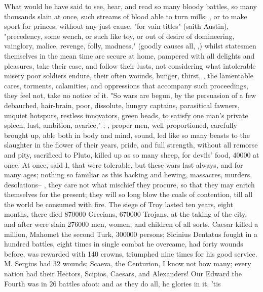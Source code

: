 What would he have said to see, hear, and read so many bloody battles, so many
thousands slain at once, such streams of blood able to turn mills: , or to make sport for princes, without any just cause,
"for vain titles" (saith Austin), "precedency, some wench,
or such like toy, or out of desire of domineering, vainglory, malice, revenge,
folly, madness," (goodly causes all, ,) whilst statesmen themselves in the mean time are secure
at home, pampered with all delights and pleasures, take their ease, and follow
their lusts, not considering what intolerable misery poor soldiers endure,
their often wounds, hunger, thirst, \etc{}, the lamentable cares, torments,
calamities, and oppressions that accompany such proceedings, they feel not,
take no notice of it. "So wars are begun, by the persuasion of a few debauched,
hair-brain, poor, dissolute, hungry captains, parasitical fawners, unquiet
hotspurs, restless innovators, green heads, to satisfy one man's private
spleen, lust, ambition, avarice," \etc{}; , proper men, well proportioned, carefully brought
up, able both in body and mind, sound, led like so many
beasts to the slaughter in the flower of their years,
pride, and full strength, without all remorse and pity, sacrificed to Pluto,
killed up as so many sheep, for devils' food, 40\thinspace{}000 at once. At
once, said I, that were tolerable, but these wars last always, and for many
ages; nothing so familiar as this hacking and hewing, massacres, murders,
desolations-- , they care not what mischief
they procure, so that they may enrich themselves for the present; they will so
long blow the coals of contention, till all the world be consumed with fire.
The siege of Troy lasted ten years, eight months, there
died 870\thinspace{}000 Grecians, 670\thinspace{}000 Trojans, at the taking of
the city, and after were slain 276\thinspace{}000 men, women, and children of
all sorts. Caesar killed a million, Mahomet the second
Turk, 300\thinspace{}000 persons; Sicinius Dentatus fought in a hundred
battles, eight times in single combat he overcame, had forty wounds before, was
rewarded with 140 crowns, triumphed nine times for his good service. M. Sergius
had 32 wounds; Scaeva, the Centurion, I know not how many; every nation had
their Hectors, Scipios, Caesars, and Alexanders! Our Edward
the Fourth was in 26 battles afoot: and as they do all, he glories in it, 'tis
